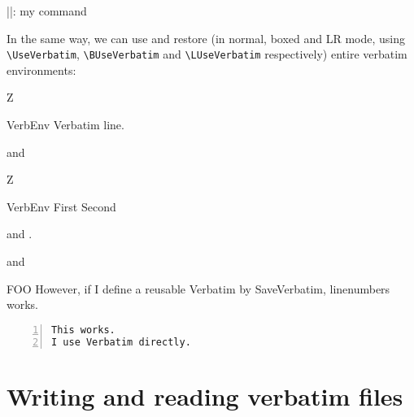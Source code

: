 \documentclass[twoside]{article}
\newcommand\cs[1]{\texttt{\textbackslash#1}}
\begin{document}
\begin{SideBySideExample}
  \newcommand{\Vitem}{%
    }
  \DefineShortVerb{\|}
  \begin{description}
    \Vitem|\MyCommand|: my command
  \end{description}
\end{SideBySideExample}

  In the same way, we can use and restore (in normal, boxed and LR mode,
using \cs{UseVerbatim}, \cs{BUseVerbatim} and \cs{LUseVerbatim} respectively)
entire verbatim environments:

\begin{SideBySideExample}
  Z
  \begin{SaveVerbatim}{VerbEnv}
    Verbatim line.
  \end{SaveVerbatim}
  and 
\end{SideBySideExample}

\begin{SideBySideExample}
  Z
  \begin{SaveVerbatim}[gobble=5]{VerbEnv}
    First
    Second
  \end{SaveVerbatim}

  and .

   and
\end{SideBySideExample}


\begin{SideBySideExample}
\begin{SaveVerbatim}{FOO}
However, if I define a
reusable Verbatim by 
SaveVerbatim,
linenumbers works.
\end{SaveVerbatim}

\begin{Verbatim}[numbers=left]
This works.
I use Verbatim directly.
\end{Verbatim}

\end{SideBySideExample}


\clearpage

\section{Writing and reading verbatim files}
\label{sec:VerbatimInclude}
\end{document}
